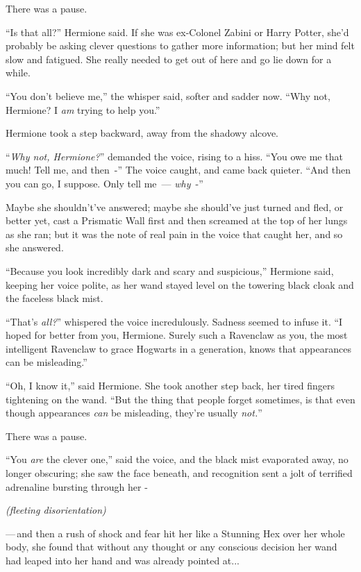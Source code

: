 There was a pause.

``Is that all?'' Hermione said. If she was ex-Colonel Zabini or Harry Potter, she'd probably be asking clever questions to gather more information; but her mind felt slow and fatigued. She really needed to get out of here and go lie down for a while.

``You don't believe me,'' the whisper said, softer and sadder now. ``Why not, Hermione? I \emph{am} trying to help you.''

Hermione took a step backward, away from the shadowy alcove.

``\emph{Why not, Hermione?}'' demanded the voice, rising to a hiss. ``You owe me that much! Tell me, and then~-'' The voice caught, and came back quieter. ``And then you can go, I suppose. Only tell me~--- \emph{why}~-''

Maybe she shouldn't've answered; maybe she should've just turned and fled, or better yet, cast a Prismatic Wall first and then screamed at the top of her lungs as she ran; but it was the note of real pain in the voice that caught her, and so she answered.

``Because you look incredibly dark and scary and suspicious,'' Hermione said, keeping her voice polite, as her wand stayed level on the towering black cloak and the faceless black mist.

``That's \emph{all?}'' whispered the voice incredulously. Sadness seemed to infuse it. ``I hoped for better from you, Hermione. Surely such a Ravenclaw as you, the most intelligent Ravenclaw to grace Hogwarts in a generation, knows that appearances can be misleading.''

``Oh, I know it,'' said Hermione. She took another step back, her tired fingers tightening on the wand. ``But the thing that people forget sometimes, is that even though appearances \emph{can} be misleading, they're usually \emph{not.}''

There was a pause.

``You \emph{are} the clever one,'' said the voice, and the black mist evaporated away, no longer obscuring; she saw the face beneath, and recognition sent a jolt of terrified adrenaline bursting through her -

\emph{(fleeting disorientation)}

---\,and then a rush of shock and fear hit her like a Stunning Hex over her whole body, she found that without any thought or any conscious decision her wand had leaped into her hand and was already pointed at...

